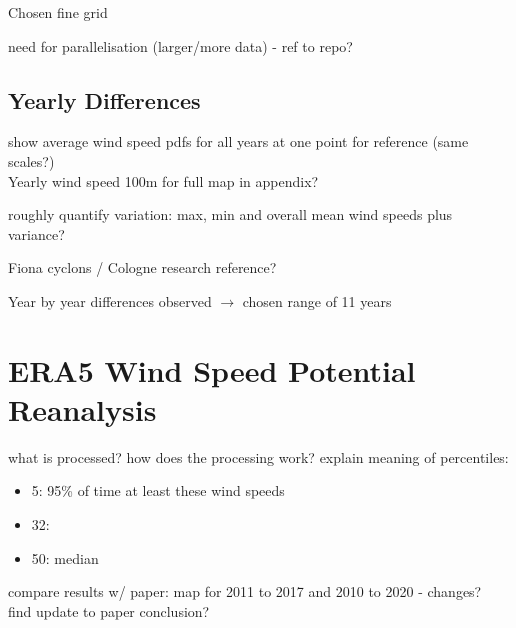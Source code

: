 Chosen fine grid

need for parallelisation (larger/more data) - ref to repo? 

\subsection{Yearly Differences}
show average wind speed pdfs for all years at one point for reference (same scales?)\\
Yearly wind speed 100m for full map in appendix? 

roughly quantify variation: max, min and overall mean wind speeds plus variance?

Fiona cyclons / Cologne research reference? 

Year by year differences observed $\rightarrow$ chosen range of 11 years\\

\section{ERA5 Wind Speed Potential Reanalysis}
what is processed? how does the processing work? explain meaning of percentiles: 
\begin{itemize}
\item 5: 95\% of time at least these wind speeds
\item 32:
\item 50: median
\end{itemize}

compare results w/ paper: map for 2011 to 2017 and 2010 to 2020 - changes? \\ 
find update to paper conclusion? 
